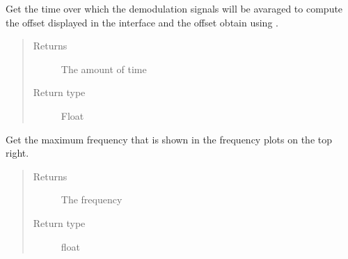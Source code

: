 \documentclass[letterpaper,10pt,english]{sphinxmanual}
\begin{document}
\begin{fulllineitems}
\begin{fulllineitems}
\end{fulllineitems}


\begin{fulllineitems}
\label{\detokenize{index:TiePieLCR_settings.TiePieLCR_settings.get_integration_time}}
\sphinxAtStartPar
Get the time over which the demodulation signals will be avaraged to compute the offset displayed in the interface and the offset obtain using .
\begin{quote}\begin{description}
\item[{Returns}] \leavevmode
\sphinxAtStartPar
The amount of time

\item[{Return type}] \leavevmode
\sphinxAtStartPar
Float

\end{description}\end{quote}

\end{fulllineitems}


\begin{fulllineitems}
\label{\detokenize{index:TiePieLCR_settings.TiePieLCR_settings.get_maximum_plot_frequency}}
\sphinxAtStartPar
Get the maximum frequency that is shown in the frequency plots on the top right.
\begin{quote}\begin{description}
\item[{Returns}] \leavevmode
\sphinxAtStartPar
The frequency

\item[{Return type}] \leavevmode
\sphinxAtStartPar
float

\end{description}\end{quote}

\end{fulllineitems}


\end{fulllineitems}
\end{document}
